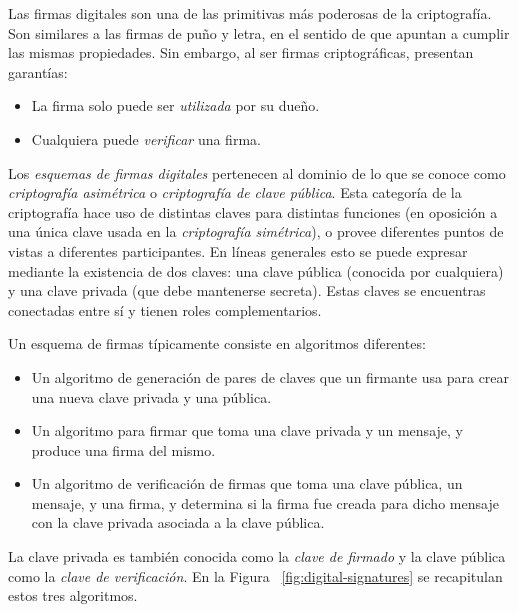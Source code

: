 %
Las firmas digitales son una de las primitivas más poderosas de la criptografía.
Son similares a las firmas de puño y letra, en el sentido de que apuntan a cumplir las mismas propiedades.
Sin embargo, al ser firmas criptográficas, presentan garantías:
\begin{itemize}
  \item La firma solo puede ser \textit{utilizada} por su dueño.
  \item Cualquiera puede \textit{verificar} una firma.
\end{itemize}
 
Los \textit{esquemas de firmas digitales} pertenecen al dominio de lo que se conoce como \textit{criptografía asimétrica}
o \textit{criptografía de clave pública}.
%
Esta categoría de la criptografía hace uso de distintas claves para distintas funciones (en oposición a una única
clave usada en la \textit{criptografía simétrica}), o provee diferentes puntos de vistas a diferentes participantes.
%
En líneas generales esto se puede expresar mediante la existencia de dos claves: una clave pública (conocida por cualquiera)
y una clave privada (que debe mantenerse secreta). Estas claves se encuentras conectadas entre sí y tienen roles complementarios.


Un esquema de firmas típicamente consiste en algoritmos diferentes:
\begin{itemize}
  \item Un algoritmo de generación de pares de claves que un firmante usa para crear una nueva clave privada y una pública.
  \item Un algoritmo para firmar que toma una clave privada y un mensaje, y produce una firma del mismo.
  \item Un algoritmo de verificación de firmas que toma una clave pública, un mensaje, y una firma, y determina si la firma
  fue creada para dicho mensaje con la clave privada asociada a la clave pública. 
\end{itemize}

La clave privada es también conocida como la \textit{clave de firmado} y la clave pública como la \textit{clave de verificación}.
En la Figura ~\ref{fig:digital-signatures} se recapitulan estos tres algoritmos.

